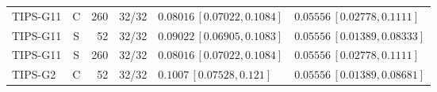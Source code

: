 \begin{longtable}{lcrcp{44mm}p{44mm}}
TIPS-G11 & C & 260 & 32/32 & \(0.08016\,[0.07022,0.1084]\) & \(0.05556\,[0.02778,0.1111]\)\\
TIPS-G11 & S & 52 & 32/32 & \(0.09022\,[0.06905,0.1083]\) & \(0.05556\,[0.01389,0.08333]\)\\
TIPS-G11 & S & 260 & 32/32 & \(0.08016\,[0.07022,0.1084]\) & \(0.05556\,[0.02778,0.1111]\)\\
TIPS-G2 & C & 52 & 32/32 & \(0.1007\,[0.07528,0.121]\) & \(0.05556\,[0.01389,0.08681]\)\\

\end{longtable}
